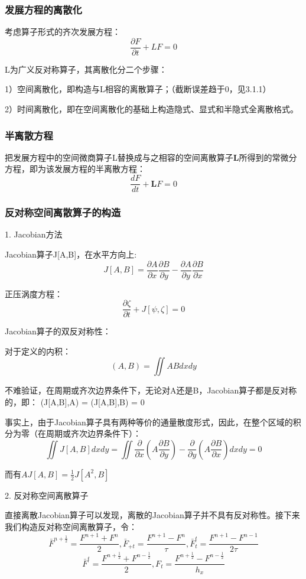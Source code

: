 \documentclass{article}
\begin{document}
\subsubsection{发展方程的离散化}
考虑算子形式的齐次发展方程：
$$\frac{\partial F}{\partial t} + LF = 0$$

L为广义反对称算子，其离散化分二个步骤：

1）空间离散化，即构造与L相容的离散算子；（截断误差趋于0，见3.1.1）

2）时间离散化，即在空间离散化的基础上构造隐式、显式和半隐式全离散格式。

\subsubsection{半离散方程}
把发展方程中的空间微商算子L替换成与之相容的空间离散算子$\mathbf{L}$所得到的常微分方程，即为该发展方程的半离散方程：
$$\frac{d F}{d t} + \mathbf{L}F = 0$$


\subsubsection{反对称空间离散算子的构造}
1. Jacobian方法

Jacobian算子J[A,B]，在水平方向上:
$$J[A,B] = \frac{\partial A}{\partial x}\frac{\partial B}{\partial y}-\frac{\partial A}{\partial y}\frac{\partial B}{\partial x}$$

正压涡度方程：
$$\frac{\partial \zeta}{\partial t}+J[\psi,\zeta]=0$$

Jacobian算子的双反对称性：

对于定义的内积：
$$(A,B) = \iint ABdxdy$$

不难验证，在周期或齐次边界条件下，无论对A还是B，Jacobian算子都是反对称的，即：
(J[A,B],A) = (J[A,B],B) = 0

事实上，由于Jacobian算子具有两种等价的通量散度形式，因此，在整个区域的积分为零（在周期或齐次边界条件下）：
$$\iint J[A,B]dxdy = \iint \frac{\partial }{\partial x}(A\frac{\partial B}{\partial y})-\frac{\partial }{\partial y}(A\frac{\partial B}{\partial x})dxdy=0$$

而有$AJ[A,B] = \frac{1}{2}J[A^2,B]$

2. 反对称空间离散算子

直接离散Jacobian算子可以发现，离散的Jacobian算子并不具有反对称性。接下来我们构造反对称空间离散算子，令：
$$\bar{F}^{n+\frac{1}{2}} = \frac{F^{n+1}+F^{n}}{2}, \bar{F}_{+t} = \frac{F^{n+1}-F^{n}}{\tau}, \bar{F}^t_t=\frac{F^{n+1}-F^{n-1}}{2\tau}$$
$$\bar{F}^t = \frac{F^{n+\frac{1}{2}}+F^{n-\frac{1}{2}}}{2}, F_t = \frac{F^{n+\frac{1}{2}}-F^{n-\frac{1}{2}}}{h_x}$$
\end{document}
